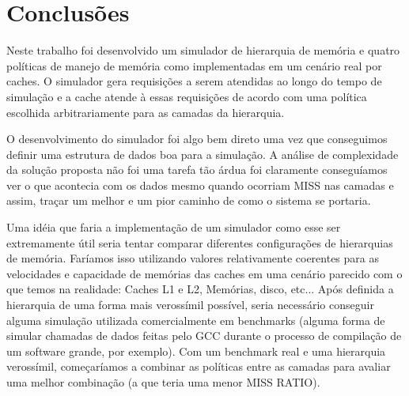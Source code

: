 \documentclass[12pt]{article}
\begin{document}
\section{Conclusões}
\label{conclusao}

Neste trabalho foi desenvolvido um simulador de hierarquia de memória e quatro políticas de manejo de memória como implementadas em um cenário real por caches. O simulador gera requisições a serem atendidas ao longo do tempo de simulação e a cache atende à essas requisições de acordo com uma política escolhida arbitrariamente para as camadas da hierarquia.

O desenvolvimento do simulador foi algo bem direto uma vez que conseguimos definir uma estrutura de dados boa para a simulação. A análise de complexidade da solução proposta não foi uma tarefa tão árdua foi claramente conseguíamos ver o que acontecia com os dados mesmo quando ocorriam MISS nas camadas e assim, traçar um melhor e um pior caminho de como o sistema se portaria.

Uma idéia que faria a implementação de um simulador como esse ser extremamente útil seria tentar comparar diferentes configurações de hierarquias de memória. Faríamos isso utilizando valores relativamente coerentes para as velocidades e capacidade de memórias das caches em uma cenário parecido com o que temos na realidade: Caches L1 e L2, Memórias, disco, etc... Após definida a hierarquia de uma forma mais verossímil possível, seria necessário conseguir alguma simulação utilizada comercialmente em benchmarks (alguma forma de simular chamadas de dados feitas pelo GCC durante o processo de compilação de um software grande, por exemplo). Com um benchmark real e uma hierarquia verossímil, começaríamos a combinar as políticas entre as camadas para avaliar uma melhor combinação (a que teria uma menor MISS RATIO).
\end{document}
